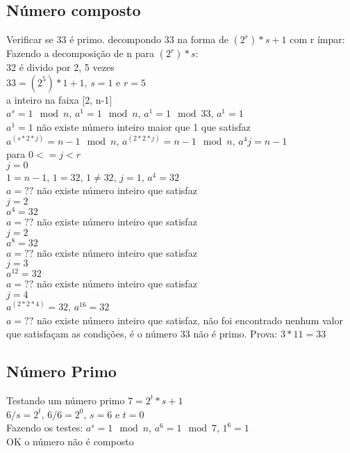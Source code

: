 \documentclass[a4paper,11pt]{article}
\theoremstyle{mytheor}
\begin{document}
\subsection*{Número composto}
Verificar se 33 é primo. decompondo 33 na forma de $(2^r)*s + 1$ com r ímpar:\\
Fazendo a decomposição de n para $(2^r)*s$:\\
32 é divido por 2, 5 vezes\\
$33 = (2^5)*1 + 1$, $s=1$ e $r=5$\\
a inteiro na faixa [2, n-1]\\
$a^s = 1 \mod n$, $a^1 = 1 \mod n$, $a^1 = 1 \mod 33$, $a^1  = 1$\\
$a^1 = 1$ não existe número inteiro maior que 1 que satisfaz\\
$a^(s*2*j) = n-1 \mod n$, $a^(2*2*j) = n-1 \mod n$, $a^4j = n - 1$\\
para $0 <= j < r$\\
$j=0$\\
$1 = n - 1$, $1 = 32$, $1 \neq 32$, $j=1$, $a^4 = 32$\\
$a = ??$ não existe número inteiro que satisfaz\\
$j=2$\\
$a^4 = 32$\\
$a = ??$ não existe número inteiro que satisfaz\\
$j=2$\\
$a^8 = 32$\\
$a = ??$ não existe número inteiro que satisfaz\\
$j=3$\\
$a^12 = 32$\\
$a = ??$ não existe número inteiro que satisfaz\\
$j=4$\\
$a^(2*2*4) = 32$, $a^16 = 32$\\
$a = ??$ não existe número inteiro que satisfaz, não foi encontrado nenhum valor que satisfaçam as condições, é o número 33 não é primo. Prova: $3 * 11 = 33$

\subsection*{Número Primo}
Testando um número primo $7 = 2^t*s + 1$\\
$6/s = 2^t$, $6/6 = 2^0$, $s = 6$ e $t = 0$\\
Fazendo os testes:
$a^s = 1 \mod n$, $a^6 = 1 \mod 7$, $1^6 = 1$\\
OK o número não é composto
\end{document}
